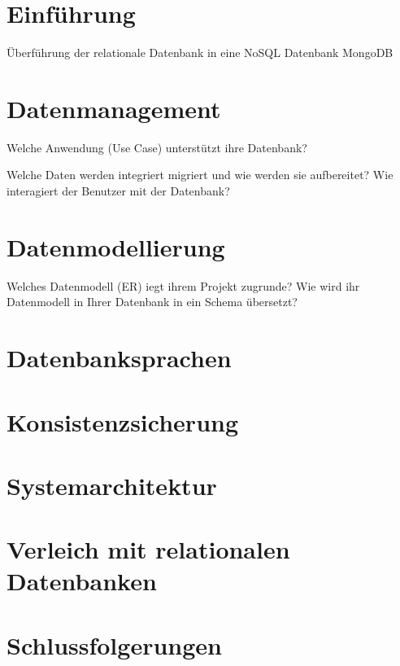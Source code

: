 \documentclass[ngerman, 12pt,a4paper]{article}
\begin{document}











\tableofcontents
\newpage

\listoffigures
\newpage
\listoftables
\newpage



\section{Einführung}

Überführung der relationale Datenbank in eine NoSQL Datenbank
MongoDB
\section{Datenmanagement}
Welche Anwendung (Use Case) unterstützt ihre Datenbank?

Welche Daten werden integriert migriert
 und wie werden sie 
aufbereitet?
Wie interagiert der Benutzer mit der Datenbank?

\section{Datenmodellierung}
Welches Datenmodell  (ER) iegt ihrem Projekt zugrunde?
Wie wird  ihr Datenmodell in Ihrer Datenbank in ein Schema übersetzt?
 \section{Datenbanksprachen}
 
 \section{Konsistenzsicherung}
 
 \section{Systemarchitektur}

\section{Verleich mit relationalen Datenbanken}

\section{Schlussfolgerungen}


\newpage
\setlength{\bibsep}{0pt}


\newpage


\end{document}
